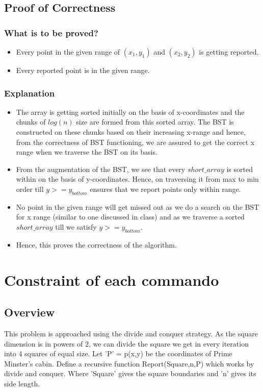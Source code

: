 \documentclass{article}
\begin{document}
\subsection{Proof of Correctness}
\subsubsection{What is to be proved?}
\begin{itemize}
\item Every point in the given range of $(x_1,y_1)$ and $(x_2,y_2)$ is getting reported.
\item Every reported point is in the given range.
\end{itemize}
\subsubsection{Explanation}
\begin{itemize}
\item The array is getting sorted initially on the basis of x-coordinates and the chunks of $log(n)$ size are formed from this sorted array. The BST is constructed on these chunks based on their increasing x-range and hence, from the correctness of BST functioning, we are assured to get the correct x range when we traverse the BST on its basis.
\item From the augmentation of the BST, we see that every $short\_array$ is sorted within on the basis of y-coordinates. Hence, on traversing it from max to min order till $y>=y_{bottom}$ ensures that we report points only within range.
\item No point in the given range will get missed out as we do a search on the BST for x range (similar to one discussed in class) and as we traverse a sorted $short\_array$ till we satisfy $y>=y_{bottom}$. 
\item Hence, this proves the correctness of the algorithm. 
\end{itemize}
\newpage
\section{Constraint of each commando}
\subsection{Overview}
This problem is approached using the divide and conquer strategy. As the square dimension is in powers of 2, we can divide the square we get in every iteration into 4 squares of equal size. Let 'P' = p(x,y) be the coordinates of Prime Minster's cabin. Define a recursive function Report(Square,n,P) which works by divide and conquer. Where 'Square' gives the square boundaries and 'n' gives its side length. 
\end{document}
